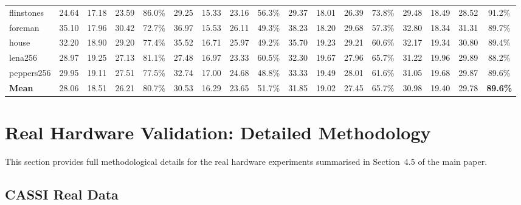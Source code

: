 \documentclass[runningheads]{llncs}
\newcommand{\best}[1]{\textcolor{bestcolor}{\textbf{#1}}}
\begin{document}
\begin{table}[h]
{\begin{tabular}{@{}l|ccc|c|ccc|c|ccc|c|ccc|c@{}}
flinstones  & 24.64 & 17.18 & 23.59 & 86.0\% & 29.25 & 15.33 & 23.16 & 56.3\% & 29.37 & 18.01 & 26.39 & 73.8\% & 29.48 & 18.49 & 28.52 & 91.2\% \\
foreman     & 35.10 & 17.96 & 30.42 & 72.7\% & 36.97 & 15.53 & 26.11 & 49.3\% & 38.23 & 18.20 & 29.68 & 57.3\% & 32.80 & 18.34 & 31.31 & 89.7\% \\
house       & 32.20 & 18.90 & 29.20 & 77.4\% & 35.52 & 16.71 & 25.97 & 49.2\% & 35.70 & 19.23 & 29.21 & 60.6\% & 32.17 & 19.34 & 30.80 & 89.4\% \\
lena256     & 28.97 & 19.25 & 27.13 & 81.1\% & 27.48 & 16.97 & 23.33 & 60.5\% & 32.30 & 19.67 & 27.96 & 65.7\% & 31.22 & 19.96 & 29.89 & 88.2\% \\
peppers256  & 29.95 & 19.11 & 27.51 & 77.5\% & 32.74 & 17.00 & 24.68 & 48.8\% & 33.33 & 19.49 & 28.01 & 61.6\% & 31.05 & 19.68 & 29.87 & 89.6\% \\
\midrule
\textbf{Mean} & 28.06 & 18.51 & 26.21 & 80.7\% & 30.53 & 16.29 & 23.65 & 51.7\% & 31.85 & 19.02 & 27.45 & 65.7\% & 30.98 & 19.40 & 29.78 & \best{89.6\%} \\
\bottomrule
\end{tabular}%
}
\end{table}

\section{Real Hardware Validation: Detailed Methodology}
\label{sec:real_perscene}

This section provides full methodological details for the real hardware experiments summarised in Section~4.5 of the main paper.

\subsection{CASSI Real Data}
\end{document}
